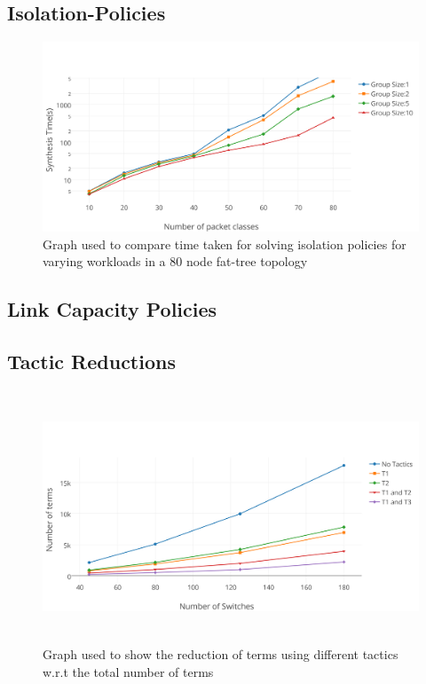 \subsection{Isolation-Policies}
\begin{figure}
	\includegraphics[width=\columnwidth]{figures/performance-isolation-groups-log-scale.png}
	\caption{Graph used to compare time taken for solving isolation policies for varying workloads in a 80 node fat-tree topology}
	\label{fig:isolation}
\end{figure}

\subsection{Link Capacity Policies}


\subsection{Tactic Reductions}
\begin{figure}
	\includegraphics[height=7.5cm]{figures/tactic-reduction.png}
	\caption{Graph used to show the reduction of terms using different tactics w.r.t the total number of terms}
	\label{fig:tactic-reduction}
\end{figure}

